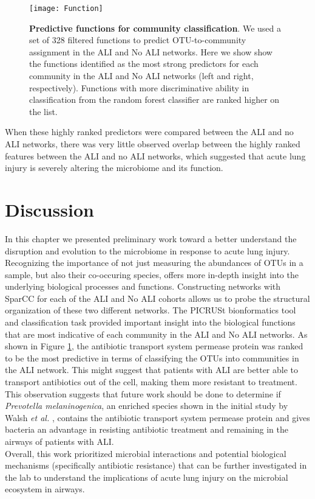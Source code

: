 \begin{figure}[h!]
\begin{center}
\texttt{[image: Function]}
\caption{{\bf Predictive functions for community classification}. We used a set of 328 filtered functions to predict OTU-to-community assignment in the ALI and No ALI networks. Here we show show the functions identified as the most strong predictors for each community in the ALI and No ALI networks (left and right, respectively). Functions with more discriminative ability in classification from the random forest classifier are ranked higher on the list.}
\label{Function}
\end{center}
\end{figure}

When these highly ranked predictors were compared between the ALI and no ALI networks, there was very little observed overlap between the highly ranked features between the ALI and no ALI networks, which suggested that acute lung injury is severely altering the microbiome and its function.

\section{Discussion}
\indent In this chapter we presented preliminary work toward a better understand the disruption and evolution to the microbiome in response to acute lung injury. Recognizing the importance of not just measuring the abundances of OTUs in a sample, but also their co-occuring species, offers more in-depth insight into the underlying biological processes and functions. Constructing networks with SparCC for each of the ALI and No ALI cohorts allows us to probe the structural organization of these two different networks. The PICRUSt bionformatics tool and classification task provided important insight into the biological functions that are most indicative of each community in the ALI and No ALI networks. As shown in Figure \ref{Function}, the antibiotic transport system permease protein was ranked to be the most predictive in terms of classifying the OTUs into communities in the ALI network. This might suggest that patients with ALI are better able to transport antibiotics out of the cell, making them more resistant to treatment. This observation suggests that future work should be done to determine if \emph{Prevotella melaninogenica}, an enriched species shown in the initial study by Walsh \emph{et al.} \cite{walsh2017}, contains the antibiotic transport system permease protein and gives bacteria an advantage in resisting antibiotic treatment and remaining  in the airways of patients with ALI. \\
\indent Overall, this work prioritized microbial interactions and potential biological mechanisms (specifically antibiotic resistance) that can be further investigated in the lab to understand the implications of acute lung injury on the microbial ecosystem in airways. 

